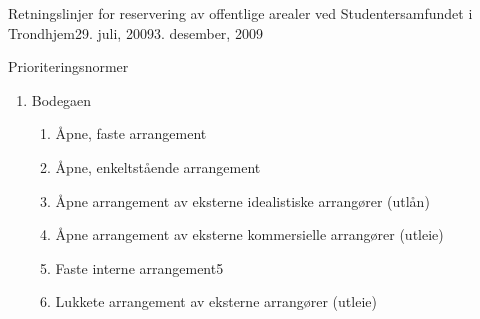\begin{instruks}{Retningslinjer for reservering av offentlige arealer
    ved Studentersamfundet i Trondhjem}{29. juli, 2009}{3. desember, 2009}
\begin{instruksledd}{Prioriteringsnormer}
\begin{enumerate}
\begin{enumerate}
                        \begin{enumerate}
                            \item Åpne, faste arrangementer/Studentersamfundets
                                Symfoniorchester
                            \item Fotballkamper på landskampnivå
                            \item Konserter
                            \item Andre åpne, enkeltstående arrangement
                            \item SIT-forestilling med tre generalprøvedager
                            \item Åpne arrangementer av Samfundets kunstneriske
                                gjenger
                            \item Andre øvinger
                            \item Åpne arrangementer av eksterne idealistiske
                                arrangører (utlån)
                            \item Faste interne arrangement4
                            \item Åpne arrangementer av eksterne kommersielle
                                arrangører (utleie)
                            \item Lukkete arrangement av eksterne arrangører
                                (utleie)
                            \item Interne fester
                        \end{enumerate}
                        4 For eksempel Samfundets Interne Grand Prix
                    \item Bodegaen
                        \begin{enumerate}
                            \item Åpne, faste arrangement
                            \item Åpne, enkeltstående arrangement
                            \item Åpne arrangement av eksterne idealistiske
                                arrangører (utlån)
                            \item Åpne arrangement av eksterne kommersielle
                                arrangører (utleie)
                            \item Faste interne arrangement5
                            \item Lukkete arrangement av eksterne arrangører (utleie)

\end{enumerate}
\end{enumerate}
\end{enumerate}
\end{instruksledd}
\end{instruks}

